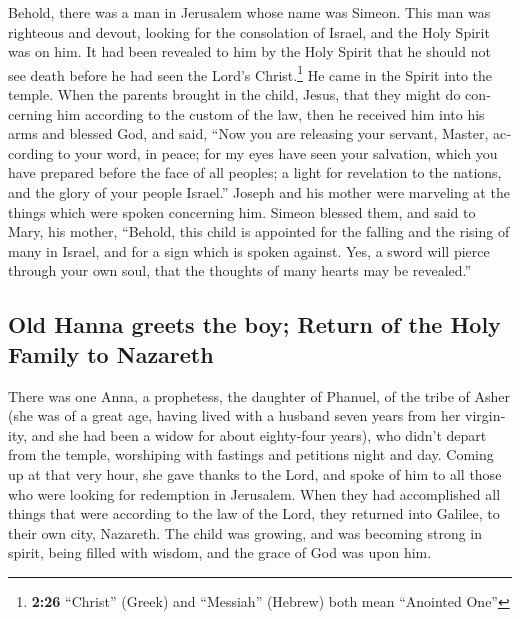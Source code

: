 \begin{paracol}{2}
\begin{otherlanguage}{english}
 Behold, there was a man in Jerusalem whose name was
Simeon. This man was righteous and devout, looking for the consolation
of Israel, and the Holy Spirit was on him.  It had been
revealed to him by the Holy Spirit that he should not see death before
he had seen the Lord's Christ.\footnote{\textbf{2:26} ``Christ'' (Greek)
  and ``Messiah'' (Hebrew) both mean ``Anointed One''} 
He came in the Spirit into the temple. When the parents brought in the
child, Jesus, that they might do concerning him according to the custom
of the law,  then he received him into his arms and
blessed God, and said,  ``Now you are releasing your
servant, Master, according to your word, in peace;  for
my eyes have seen your salvation,  which you have
prepared before the face of all peoples;  a light for
revelation to the nations, and the glory of your people Israel.''
 Joseph and his mother were marveling at the things which
were spoken concerning him.  Simeon blessed them, and
said to Mary, his mother, ``Behold, this child is appointed for the
falling and the rising of many in Israel, and for a sign which is spoken
against.  Yes, a sword will pierce through your own soul,
that the thoughts of many hearts may be revealed.''

\hypertarget{old-hanna-greets-the-boy-return-of-the-holy-family-to-nazareth}{%
\subsection{Old Hanna greets the boy; Return of the Holy Family to
Nazareth}\label{old-hanna-greets-the-boy-return-of-the-holy-family-to-nazareth}}

 There was one Anna, a prophetess, the daughter of
Phanuel, of the tribe of Asher (she was of a great age, having lived
with a husband seven years from her virginity,  and she
had been a widow for about eighty-four years), who didn't depart from
the temple, worshiping with fastings and petitions night and day.
 Coming up at that very hour, she gave thanks to the
Lord, and spoke of him to all those who were looking for redemption in
Jerusalem.  When they had accomplished all things that
were according to the law of the Lord, they returned into Galilee, to
their own city, Nazareth.  The child was growing, and was
becoming strong in spirit, being filled with wisdom, and the grace of
God was upon him.


\end{otherlanguage}
\end{paracol}
